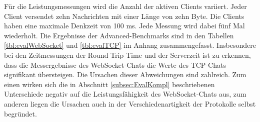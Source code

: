 \documentclass[11pt,a4paper,titlepage]{scrartcl}
\numberwithin{equation}{section}
\begin{document}
\noindent Für die Leistungsmessungen wird die Anzahl der aktiven Clients variiert. Jeder Client versendet zehn Nachrichten mit einer Länge von zehn Byte. Die Clients haben eine maximale Denkzeit von 100 ms. Jede Messung wird dabei fünf Mal wiederholt. Die Ergebnisse der Advanced-Benchmarks sind in den Tabellen \ref{tbl:evalWebSocket} und \ref{tbl:evalTCP} im Anhang zusammengefasst. Insbesondere bei den Zeitmessungen der Round Trip Time und der Serverzeit ist zu erkennen, dass die Messergebnisse des WebSocket-Chats die Werte des TCP-Chats signifikant übersteigen. Die Ursachen dieser Abweichungen sind zahlreich. Zum einen wirken sich die in Abschnitt \ref{subsec:EvalKompl} beschriebenen Unterschiede negativ auf die Leistungsfähigkeit des WebSocket-Chats aus, zum anderen liegen die Ursachen auch in der Verschiedenartigkeit der Protokolle selbst begründet. \\
\end{document}
